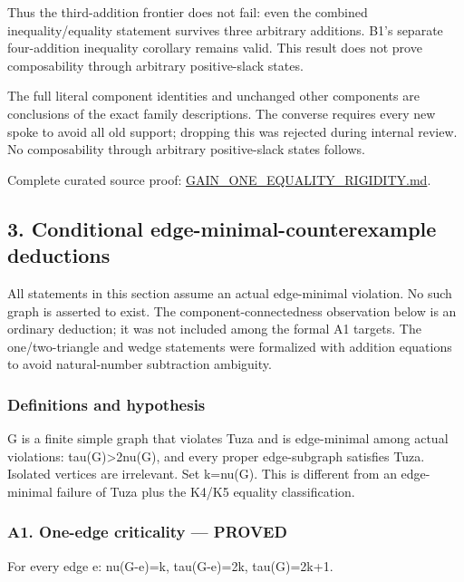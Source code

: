 \documentclass[11pt]{article}
\begin{document}
Thus the third-addition frontier does not fail: even the combined inequality/equality statement survives three arbitrary additions. B1's separate four-addition inequality corollary remains valid. This result does not prove composability through arbitrary positive-slack states.

The full literal component identities and unchanged other components are conclusions of the exact family descriptions. The converse requires every new spoke to avoid all old support; dropping this was rejected during internal review. No composability through arbitrary positive-slack states follows.

Complete curated source proof: \href{https://github.com/pappa211/ai-math-experiments/blob/main/problems/TUZA-07/notes/GAIN_ONE_EQUALITY_RIGIDITY.md}{GAIN\_ONE\_EQUALITY\_RIGIDITY.md}.

\subsection{3. Conditional edge-minimal-counterexample deductions}\label{conditional-edge-minimal-counterexample-deductions}

All statements in this section assume an actual edge-minimal violation. No such graph is asserted to exist. The component-connectedness observation below is an ordinary deduction; it was not included among the formal A1 targets. The one/two-triangle and wedge statements were formalized with addition equations to avoid natural-number subtraction ambiguity.

\subsubsection{Definitions and hypothesis}\label{definitions-and-hypothesis}

G is a finite simple graph that violates Tuza and is edge-minimal among actual violations: tau(G)\textgreater2nu(G), and every proper edge-subgraph satisfies Tuza. Isolated vertices are irrelevant. Set k=nu(G). This is different from an edge-minimal failure of Tuza plus the K4/K5 equality classification.

\subsubsection{A1. One-edge criticality --- PROVED}\label{a1.-one-edge-criticality-proved}

For every edge e: nu(G-e)=k, tau(G-e)=2k, tau(G)=2k+1.
\end{document}
